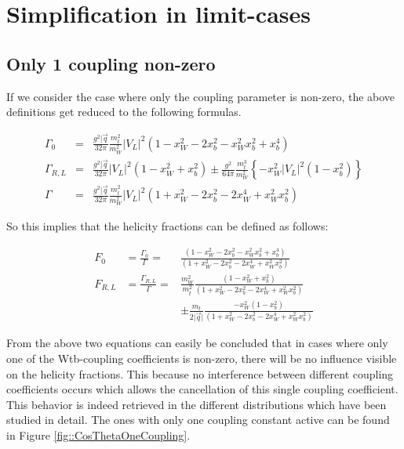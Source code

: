 \section{Simplification in limit-cases}
\subsection{Only 1 coupling non-zero}
If we consider the case where only the \VL coupling parameter is non-zero, the above definitions get reduced to the following formulas.

\begin{eqnarray}
 \Gamma_{0} & = & \frac{g^{2} \vert \vec{q}}{32 \pi} \frac{m_{t}^{2}}{m_{W}^{2}} \vert V_{L} \vert^{2} (1 - x_{W}^{2} - 2x_{b}^{2} -x_{W}^{2} x_{b}^{2} + x_{b}^{4}) \\
 \Gamma_{R,L} & = & \frac{g^{2} \vert \vec{q}}{32 \pi}  \vert V_{L} \vert^{2} (1 - x_{W}^{2} + x_{b}^{2}) \pm \frac{g^{2}}{64 \pi} \frac{m_{t}^{3}}{m_{W}^{2}} \left\lbrace -x_{W}^{2}  \vert V_{L} \vert^{2} (1-x_{b}^{2}) \right\rbrace \\
 \Gamma & = & \frac{g^{2} \vert \vec{q}}{32 \pi} \frac{m_{t}^{2}}{m_{W}^{2}} \vert V_{L} \vert^{2} (1 + x_{W}^{2} - 2x_{b}^{2} - 2 x_{W}^{4} + x_{W}^{2} x_{b}^{2})
\end{eqnarray}

So this implies that the helicity fractions can be defined as follows:

\begin{eqnarray}
 F_{0}   & = \frac{\Gamma_{0}}{\Gamma} =   & \frac{(1 - x_{W}^{2} - 2x_{b}^{2} -x_{W}^{2} x_{b}^{2} + x_{b}^{4})}{(1 + x_{W}^{2} - 2x_{b}^{2} - 2 x_{W}^{4} + x_{W}^{2} x_{b}^{2})} \label{eq::F0MasslessB} \\
 F_{R,L} & = \frac{\Gamma_{R,L}}{\Gamma} = & \frac{m_{W}^{2}}{m_{t}^{2}} \frac{(1 - x_{W}^{2} + x_{b}^{2})}{(1 + x_{W}^{2} - 2x_{b}^{2} - 2 x_{W}^{4} + x_{W}^{2} x_{b}^{2})} \nonumber \\
         &                                 & \pm \frac{m_{t}}{2 \vert \vec{q} \vert} \frac{ -x_{W}^{2} (1-x_{b}^{2})}{(1 + x_{W}^{2} - 2x_{b}^{2} - 2 x_{W}^{4} + x_{W}^{2} x_{b}^{2})} \label{eq::FRLMasslessB}
\end{eqnarray}

From the above two equations can easily be concluded that in cases where only one of the Wtb-coupling coefficients is non-zero, there will be no influence visible on the helicity fractions. This because no interference between different coupling coefficients occurs which allows the cancellation of this single coupling coefficient. This behavior is indeed retrieved in the different \csTh distributions which have been studied in detail. The ones with only one coupling constant active can be found in Figure \ref{fig::CosThetaOneCoupling}.\\

